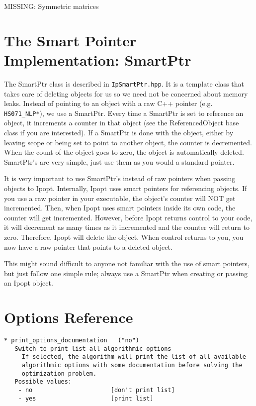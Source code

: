 \documentclass[letter,10pt]{article}
\begin{document}
{MISSING: Symmetric matrices


\section{The Smart Pointer Implementation: SmartPtr} \label{app.smart_ptr}

The SmartPtr class is described in {\tt IpSmartPtr.hpp}. It is a
template class that takes care of deleting objects for us so we need
not be concerned about memory leaks. Instead of pointing to an object
with a raw C++ pointer (e.g. {\tt HS071\_NLP*}), we use a SmartPtr.
Every time a SmartPtr is set to reference an object, it increments a
counter in that object (see the ReferencedObject base class if you are
interested). If a SmartPtr is done with the object, either by leaving
scope or being set to point to another object, the counter is
decremented. When the count of the object goes to zero, the object is
automatically deleted. SmartPtr's are very simple, just use them as
you would a standard pointer.

It is very important to use SmartPtr's instead of raw pointers when
passing objects to Ipopt. Internally, Ipopt uses smart pointers for
referencing objects. If you use a raw pointer in your executable, the
object's counter will NOT get incremented. Then, when Ipopt uses smart
pointers inside its own code, the counter will get
incremented. However, before Ipopt returns control to your code, it
will decrement as many times as it incremented and the counter will
return to zero. Therefore, Ipopt will delete the object. When control
returns to you, you now have a raw pointer that points to a deleted
object.

This might sound difficult to anyone not familiar with the use of
smart pointers, but just follow one simple rule; always use a SmartPtr
when creating or passing an Ipopt object.

\section{Options Reference} \label{app.options_ref}
\begin{verbatim}
* print_options_documentation   ("no")
   Switch to print list all algorithmic options
     If selected, the algorithm will print the list of all available
     algorithmic options with some documentation before solving the
     optimization problem.
   Possible values:
    - no                      [don't print list]
    - yes                     [print list]



\end{verbatim}}
\end{document}
